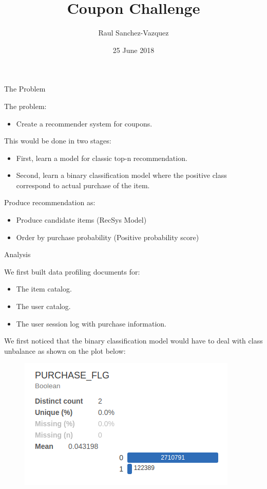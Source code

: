 \documentclass{beamer}
\title[Hacking the Xgboost]{Coupon Challenge}
\author{Raul Sanchez-Vazquez}
\institute{}
\date{25 June 2018}
\begin{document}
\begin{frame}
  \titlepage
  
\end{frame}

\begin{frame}{The Problem}
	
	The problem:
	
	\begin{itemize}
		\item 	Create a recommender system for coupons.
	\end{itemize}

	This would be done in two stages:
		\begin{itemize}
			\item 	First, learn a model for classic top-n recommendation.
			\item 	Second, learn a binary classification model where the positive class correspond to actual purchase of the item.
		\end{itemize}
		
	Produce recommendation as:
	\begin{itemize}
		\item 	Produce candidate items (RecSys Model)
		\item 	Order by purchase probability (Positive probability score)
	\end{itemize}
\end{frame}
	
\begin{frame}{Analysis}
	
	We first built data profiling documents for:
	
	\begin{itemize}
		\item The item catalog.
		\item The user catalog.
		\item The user session log with purchase information.
	\end{itemize}
	
	We first noticed that the binary classification model would have to deal with class unbalance as shown on the plot below: 
	
	\begin{figure}
		\centering
		\includegraphics[width=0.7\linewidth]{../img/target}
		\caption{}
		\label{fig:target}
	\end{figure}
\end{frame}
\end{document}
